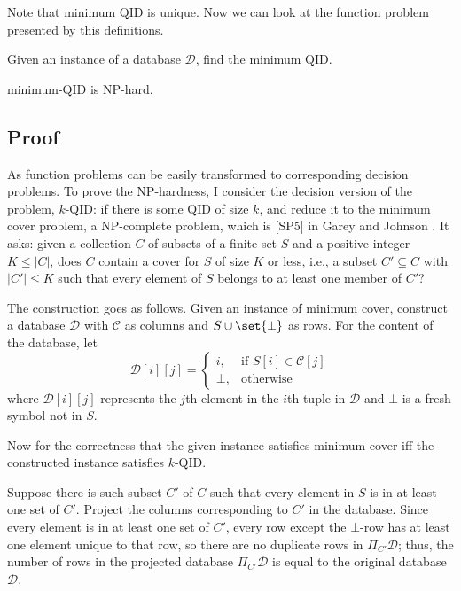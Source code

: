 \documentclass[12pt]{llncs}
\DeclarePairedDelimiter\set\{\}
\newcommand{\cC}{\mathcal{C}}
\newcommand{\cD}{\mathcal{D}}
\newcommand{\Proj}[1]{\Pi_{#1}}
\begin{document}
Note that minimum QID is unique. Now we can look at the function problem presented by this definitions.

\begin{problem}
Given an instance of a database $\cD$, find the minimum QID.
\end{problem}

\begin{proposition}
minimum-QID is NP-hard.
\end{proposition}

\subsection{Proof}
As function problems can be easily transformed to corresponding decision problems. To prove the NP-hardness, I consider the decision version of the problem, $k$-QID: if there is some QID of size $k$, and reduce it to the minimum cover problem, a NP-complete problem, which is [SP5] in Garey and Johnson \cite{Garey:1990}. It asks: given a collection $C$ of subsets of a finite set $S$ and a positive integer $K \leq |C|$, does $C$ contain a cover for $S$ of size $K$ or less, i.e., a subset $C' \subseteq C$ with $|C'| \leq K$ such that every element of $S$ belongs to at least one member of $C'$?

The construction goes as follows. Given an instance of minimum cover, construct a database $\cD$ with $\cC$ as columns and $S \cup \set{\bot}$ as rows. For the content of the database, let
$$
\cD[i][j] =
\begin{cases}
    i,    &\text{if } S[i] \in \cC[j]\\
    \bot, &\text{otherwise}
\end{cases}
$$
where $\cD[i][j]$ represents the $j$th element in the $i$th tuple in $\cD$ and $\bot$ is a fresh symbol not in $S$.

Now for the correctness that the given instance satisfies minimum cover iff the constructed instance satisfies $k$-QID.

Suppose there is such subset $C'$ of $C$ such that every element in $S$ is in at least one set of $C'$. Project the columns corresponding to $C'$ in the database. Since every element is in at least one set of $C'$, every row except the $\bot$-row has at least one element unique to that row, so there are no duplicate rows in $\Proj{C'} \cD$; thus, the number of rows in the projected database $\Proj{C'} \cD$ is equal to the original database $\cD$.
\end{document}
